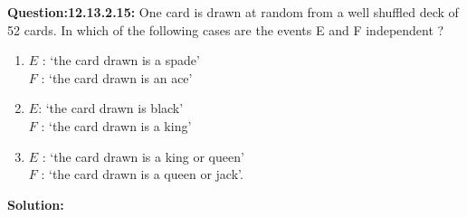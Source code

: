 \documentclass[12pt, journal]{IEEEtran}
\begin{document}
		\maketitle
		\textbf{Question:12.13.2.15:}
		One card is drawn at random from a well shuffled deck of 52 cards. In which of
		the following cases are the events E and F independent ?
	\begin{enumerate}[label=(\roman*)]
		\item $E$ : ‘the card drawn is a spade’\\
			$F$ : ‘the card drawn is an ace’
		
		\item $E$: ‘the card drawn is black’\\
			$F$ : ‘the card drawn is a king’
		
		\item $E$ : ‘the card drawn is a king or queen’\\
			$F$ : ‘the card drawn is a queen or jack’.
	\end{enumerate}
	
	\textbf{Solution:}
\end{document}
